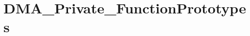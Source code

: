 \hypertarget{group___d_m_a___private___function_prototypes}{\section{D\-M\-A\-\_\-\-Private\-\_\-\-Function\-Prototypes}
\label{group___d_m_a___private___function_prototypes}
}
